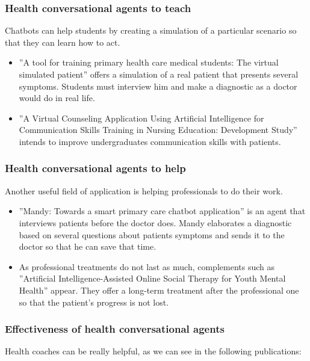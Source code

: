\documentclass[12pt,english]{article}
\begin{document}
\subsubsection{Health conversational agents to teach}

Chatbots can help students by creating a simulation of a particular scenario so that they can learn how to act.
\begin{itemize}
  \item ''A tool for training primary health care medical students: The virtual simulated patient''\cite{a1} offers a simulation of a real patient that presents several symptoms. Students must interview him and make a diagnostic as a doctor would do in real life.
  \item ''A Virtual Counseling Application Using Artificial Intelligence for Communication Skills Training in Nursing Education: Development Study'' \cite{a8} intends to improve undergraduates communication skills with patients.
\end{itemize}


\subsubsection{Health conversational agents to help}

Another useful field of application is helping professionals to do their work.

\begin{itemize}
  \item ''Mandy: Towards a smart primary care chatbot application'' \cite{a2} is an agent that interviews patients before the doctor does. Mandy elaborates a diagnostic based on several questions about patients symptoms and sends it to the doctor so that he can save that time.
  \item As professional treatments do not last as much, complements such as ''Artificial Intelligence-Assisted Online Social Therapy for Youth Mental Health'' \cite{a5} appear. They offer a long-term treatment after the professional one so that the patient's progress is not lost.
\end{itemize}

\subsubsection{Effectiveness of health conversational agents}

Health coaches can be really helpful, as we can see in the following publications:
\end{document}
